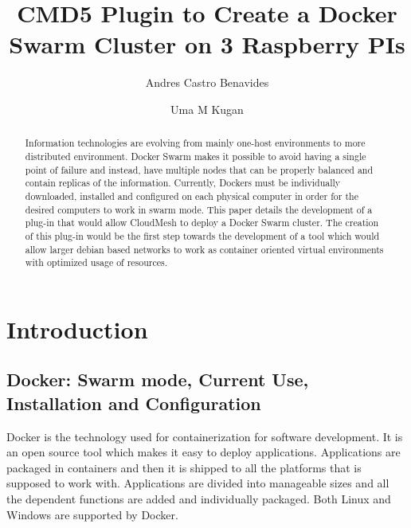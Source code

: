 
\title{CMD5 Plugin to Create a Docker Swarm Cluster on 3 Raspberry PIs}
	
	\author{Andres Castro Benavides}
	
	\author{Uma M Kugan}
	\renewcommand{\shortauthors}{Uma Kugan, Andres Castro}
  
	\begin{abstract}
		Information technologies are evolving from mainly one-host
    environments to more distributed environment. Docker
    Swarm makes it possible to avoid having a single 
    point of failure and instead, have multiple nodes that
    can be properly balanced and contain replicas of the 
    information. Currently, Dockers must be individually
    downloaded, installed and configured on each physical
    computer in order for the desired computers to work in 
    swarm mode. This paper details the development of a 
    plug-in that would allow CloudMesh to deploy a Docker
    Swarm cluster.  The creation of this plug-in would be
    the first step towards the development of a tool which
    would allow larger debian based networks to work as 
    container oriented virtual environments with optimized
    usage of resources.
	\end{abstract}
	
	
	\maketitle
	
	\section{Introduction}
	
	\subsection{Docker: Swarm mode, Current Use, Installation
  and Configuration}
	Docker is the technology used for containerization for
  software development. It is an open source tool which makes
  it easy to deploy applications. Applications are packaged 
  in containers and then it is shipped to all the platforms
  that is supposed to work with. Applications are divided 
  into manageable sizes and all the dependent functions are
  added and individually packaged. Both Linux and Windows
  are supported by Docker.
	
